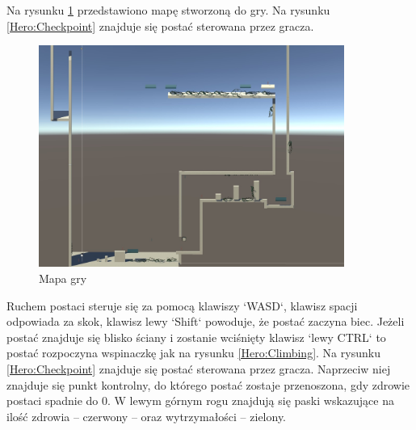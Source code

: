 \documentclass[12pt,twoside]{article}
\begin{document}
Na rysunku \ref{Map} przedstawiono mapę stworzoną do gry. Na rysunku
\ref{Hero:Checkpoint} znajduje się postać sterowana przez gracza. 

\begin{figure}[ht]
    \centering
	\includegraphics[width=10cm]{RealizacjaProjektu/UnityPictires/Map.jpg}
	\caption{Mapa gry}
    \label{Map}
\end{figure}

Ruchem postaci steruje się za pomocą klawiszy `WASD`, klawisz spacji odpowiada
za skok, klawisz lewy `Shift` powoduje, że postać zaczyna biec. Jeżeli postać
znajduje się blisko ściany i zostanie wciśnięty klawisz `lewy CTRL` to postać
rozpoczyna wspinaczkę jak na rysunku \ref{Hero:Climbing}. Na rysunku \ref{Hero:Checkpoint} znajduje się postać
sterowana przez gracza. Naprzeciw niej znajduje się punkt kontrolny, do którego
postać zostaje przenoszona, gdy zdrowie postaci spadnie do 0. W lewym górnym
rogu znajdują się paski wskazujące na ilość zdrowia -- czerwony -- oraz
wytrzymałości -- zielony.
\end{document}
